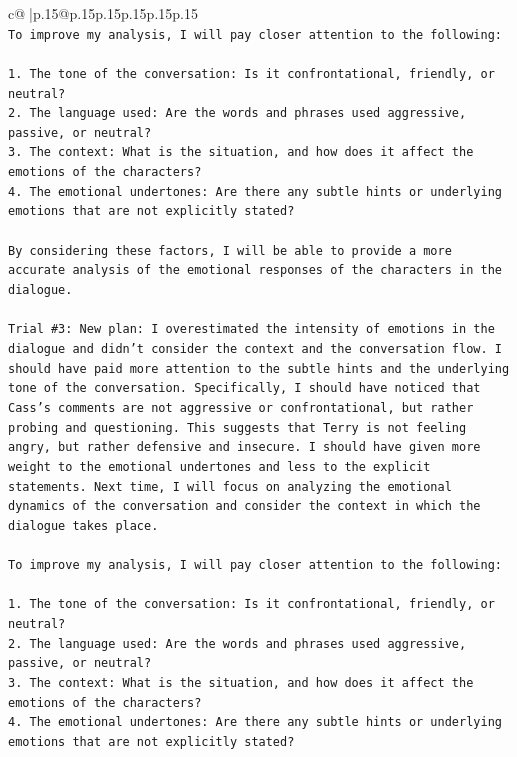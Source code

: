 \documentclass{article}
\begin{document}
{\begin{supertabular}{c@{$\;$}|p{.15\linewidth}@{}p{.15\linewidth}p{.15\linewidth}p{.15\linewidth}p{.15\linewidth}p{.15\linewidth}}
{{{\\ 
\texttt{To improve my analysis, I will pay closer attention to the following:} \\
\\ 
\texttt{1. The tone of the conversation: Is it confrontational, friendly, or neutral?} \\
\texttt{2. The language used: Are the words and phrases used aggressive, passive, or neutral?} \\
\texttt{3. The context: What is the situation, and how does it affect the emotions of the characters?} \\
\texttt{4. The emotional undertones: Are there any subtle hints or underlying emotions that are not explicitly stated?} \\
\\ 
\texttt{By considering these factors, I will be able to provide a more accurate analysis of the emotional responses of the characters in the dialogue.} \\
\\ 
\texttt{Trial \#3: New plan: I overestimated the intensity of emotions in the dialogue and didn't consider the context and the conversation flow. I should have paid more attention to the subtle hints and the underlying tone of the conversation. Specifically, I should have noticed that Cass's comments are not aggressive or confrontational, but rather probing and questioning. This suggests that Terry is not feeling angry, but rather defensive and insecure. I should have given more weight to the emotional undertones and less to the explicit statements. Next time, I will focus on analyzing the emotional dynamics of the conversation and consider the context in which the dialogue takes place.} \\
\\ 
\texttt{To improve my analysis, I will pay closer attention to the following:} \\
\\ 
\texttt{1. The tone of the conversation: Is it confrontational, friendly, or neutral?} \\
\texttt{2. The language used: Are the words and phrases used aggressive, passive, or neutral?} \\
\texttt{3. The context: What is the situation, and how does it affect the emotions of the characters?} \\
\texttt{4. The emotional undertones: Are there any subtle hints or underlying emotions that are not explicitly stated?} \\
\\ 
}}}
\end{supertabular}}
\end{document}
